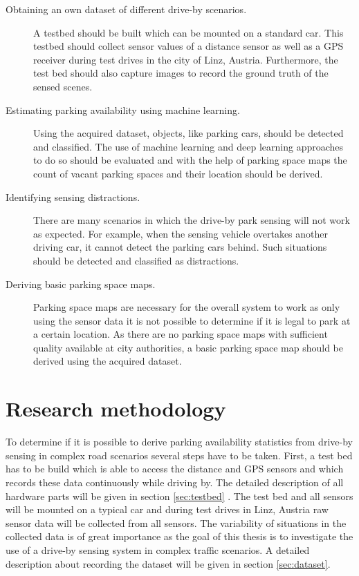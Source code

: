 \begin{description}

\item[Obtaining an own dataset of different drive-by scenarios.] A testbed should be built which can be mounted on a standard car. This testbed should collect sensor values of a distance sensor as well as a GPS receiver during test drives in the city of Linz, Austria. Furthermore, the test bed should also capture images to record the ground truth of the sensed scenes.

\item[Estimating parking availability using machine learning.] Using the acquired dataset, objects, like parking cars, should be detected and classified. The use of machine learning and deep learning approaches to do so should be evaluated and with the
help of parking space maps the count of vacant parking spaces and their location should be derived.

\item[Identifying sensing distractions.] There are many scenarios in which the drive-by park sensing will not work as expected. For example, when the sensing vehicle overtakes another driving car, it cannot detect the parking cars behind. Such situations
should be detected and classified as distractions.

\item[Deriving basic parking space maps.] Parking space maps are necessary for the overall system to work as only using the sensor data it is not possible to determine if it is legal to park at a certain location. As there are no parking space maps with sufficient quality available at city authorities, a basic parking space map should be derived using the acquired dataset.

\end{description}




\section{Research methodology}
To determine if it is possible to derive parking availability statistics from drive-by sensing in complex road scenarios several steps have to be taken. First, a test bed has to be build which is able to access the distance and GPS sensors and which records these data continuously while driving by. The detailed description of all hardware parts will be given in section \ref{sec:testbed} . The test bed and all sensors will be mounted on a typical car and during test drives in Linz, Austria raw sensor data will be collected from all sensors. The variability of situations in the collected data is of great importance as the goal of this thesis is to investigate the use of a drive-by sensing system in complex traffic scenarios. A detailed description about recording the dataset will be given in
section  \ref{sec:dataset}.

